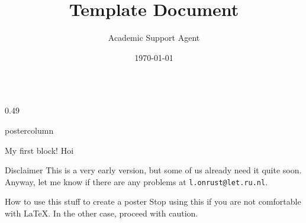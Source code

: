 \documentclass{article}
\title{Template Document}
\author{Academic Support Agent}
\date{\today}
\begin{document}
\maketitle

\begin{frame}
\begin{columns}
\begin{column}{0.49\textwidth}
\begin{beamercolorbox}[center, wd=\textwidth]{postercolumn}
\begin{minipage}[T]{0.95\textwidth}
\parbox[t][\columnheight]{\textwidth}{%
  \begin{block}{My first block!}
  	Hoi
  \end{block}
  \medskip
  \begin{block}{Disclaimer}
  	This is a very early version, but some of us already need it quite soon. Anyway, let me know if there are any problems at \texttt{l.onrust@let.ru.nl}.
  \end{block}
 	\medskip
    \begin{block}{How to use this stuff to create a poster}
    	Stop using this if you are not comfortable with \LaTeX. In the other case, proceed with caution.
        

\end{block}}
\end{minipage}
\end{beamercolorbox}
\end{column}
\end{columns}
\end{frame}
\end{document}
